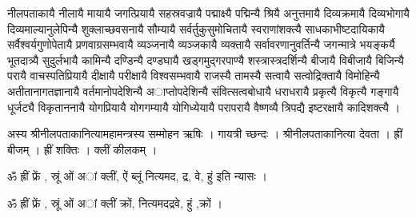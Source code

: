 नीलपताकायै नीलायै मायायै जगत्प्रियायै सहस्रवज्रायै पद्माक्ष्यै पद्मिन्यै श्रियै अनुत्तमायै दिव्यक्रमायै दिव्यभोगायै दिव्यमाल्यानुलेपिन्यै शुक्लाच्छवसनायै सौम्यायै सर्वर्तुकुसुमोचितायै स्वराणांशक्त्यै साधकाभीष्टदायिकायै सर्वैश्वर्यगुणोपेतायै प्रणवाग्रसम्भवायै व्यञ्जनायै व्यञ्जकायै व्यक्तायै सर्वावरणानुवर्तिन्यै जगन्मात्रे भयङ्कर्यै भूतदात्र्यै सुदुर्लभायै कामिन्यै दण्डिन्यै दण्डघायै खड्गमुद्गरपाण्यै शस्त्रास्त्रदर्शिन्यै बीजायै विबीजायै बिजिन्यै परायै वाचस्पतिप्रियायै दीक्षायै परीक्षायै विश्वसम्भवायै राजस्यै तामस्यै सत्वायै सत्वोद्रिक्तायै विमोहिन्यै अतीतानागतज्ञानायै वर्तमानोपदेशिन्यै अाप्तोपदेशिन्यै संवित्सत्वबोधायै धराधरायै प्रकृत्यै विकृत्यै गङ्गायै धूर्जट्यै विकृताननायै योगप्रियायै योगगम्यायै योगिध्येयायै परापरायै वैष्णव्यै त्रिपद्यै इष्टरक्षायै कादिशक्त्यै ।

अस्य श्रीनीलपताकानित्यामहामन्त्रस्य सम्मोहन ऋषिः । गायत्री च्छन्दः । श्रीनीलपताकानित्या देवता । ह्रीं बीजम् । ह्रीं शक्तिः । क्लीं कीलकम् ।

ॐ ह्रीं फ्रें , स्रूं ओं अां क्लीं, ऐं ब्लूं  नित्यमद, द्र, वे, हुं  इति न्यासः ।

ॐ ह्रीं फ्रें , स्रूं ओं अां क्लीं  क्रों, नित्यमदद्रवे, हुं ,क्रों  ।
